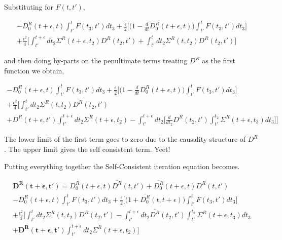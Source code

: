 \documentclass{amsart}
\begin{document}
    Substituting for $F(t,t')$, 
    
        \begin{multline}\label{byparts4}
            -D_0^R(t+\epsilon, t)\int^{t}_{t'}F(t_3,t')dt_3 +\frac{\epsilon}{2} \Big[ \Big(1-\frac{d}{dt}D_0^R(t+\epsilon,t)\Big)\int^{t}_{t'} F(t_3,t')dt_3 ]\\ +\frac{\epsilon^2}{4} 
            \Big[ \int^{t+\epsilon}_{t'} dt_2  \Sigma^R (t+\epsilon,t_2) D^R(t_2, t')
            +\int^{t}_{t'} dt_2  \Sigma^R (t,t_2) D^R(t_2, t') \Big]
        \end{multline}
        
    and then doing by-parts on the penultimate terms treating $D^R$ as the first function we obtain,
    
    
        \begin{multline}\label{byparts5}
            -D_0^R(t+\epsilon, t)\int^{t}_{t'}F(t_3,t')dt_3 +\frac{\epsilon}{2} \Big[ \Big(1-\frac{d}{dt}D_0^R(t+\epsilon,t)\Big)\int^{t}_{t'} F(t_3,t')dt_3 \Big]\\ +\frac{\epsilon^2}{4} 
            \Big[ \int^{t}_{t'} dt_2  \Sigma^R (t,t_2) D^R(t_2, t') 
            \\+  D^R(t+\epsilon, t')\int^{t+\epsilon}_{t'} dt_2  \Sigma^R (t+\epsilon,t_2) -\int^{t+\epsilon}_{t'} dt_2 \big[\frac{d}{dt_2} D^R(t_2 ,t')\int^{t_2}_{t'} \Sigma^R(t+\epsilon,t_3)dt_3\big]
            \Big]
        \end{multline}
        
    The lower limit of the first term goes to zero due to the causality structure of $D^R$. The upper limit gives the self consistent term. Yeet!
    \par Putting everything together the Self-Consistent iteration equation becomes.   
    
    
    
        \begin{multline}\label{selfconsitentdyson1}
             {\mathbf{D^R(t+\epsilon , t')} = D^R_0(t+\epsilon , t)\overline{D^R}(t , t')+\overline{D^R_0}(t+\epsilon , t)D^R(t , t')}
                        \\  {-D_0^R(t+\epsilon, t)\int^{t}_{t'}F(t_3,t')dt_3 +\frac{\epsilon}{2} \Big[ \Big(1+\overline{D_0^R}(t,t+\epsilon)\Big)\int^{t}_{t'} F(t_3,t')dt_3 \Big]}\\  {+\frac{\epsilon^2}{4} 
                        \Big[ \int^{t}_{t'} dt_2  \Sigma^R (t,t_2) D^R(t_2, t') -\int^{t+\epsilon}_{t'} dt_2  \overline{D^R}(t_2 ,t')\int^{t_2}_{t'} \Sigma^R(t+\epsilon,t_3)dt_3}
                        \\ {+ \mathbf{D^R(t+\epsilon , t')}\int^{t+\epsilon}_{t'} dt_2  \Sigma^R (t+\epsilon,t_2) \Big]}
        \end{multline}
        
\end{document}
